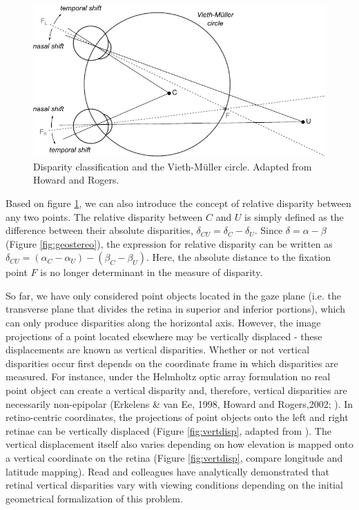 \documentclass[oneside,12pt]{classes/CUEDthesisPSnPDF}
\begin{document}
\begin{figure}
  \centering
  \includegraphics{disparity-classification}
  \caption{Disparity classification and the Vieth-M{\"u}ller circle. Adapted from Howard and Rogers.}
  \label{fig:dispclass}
\end{figure}

Based on figure \ref{fig:dispclass}, we can also introduce the concept of relative disparity between any two points. The relative disparity between $C$ and $U$ is simply defined as the difference between their absolute disparities, $\delta_{CU} = \delta_{C} - \delta_{U}$. Since $\delta  = \alpha - \beta$ (Figure \ref{fig:geostereo}), the expression for relative disparity can be written as $\delta_{CU} = (\alpha_C-\alpha_U) - (\beta_C-\beta_U)$. Here, the absolute distance to the fixation point $F$ is no longer determinant in the measure of disparity.

So far, we have only considered point objects located in the gaze plane (i.e. the transverse plane that divides the retina in superior and inferior portions), which can only produce disparities along the horizontal axis. However, the image projections of a point located elsewhere may be vertically displaced - these displacements are known as vertical disparities. Whether or not vertical disparities occur first depends on the coordinate frame in which disparities are measured. For instance, under the Helmholtz optic array formulation no real point object can create a vertical disparity and, therefore, vertical disparities are necessarily non-epipolar (Erkelens \& van Ee, 1998, Howard and Rogers,2002; \cite{Read2009}). In retino-centric coordinates, the projections of point objects onto the left and right retinae can be vertically displaced (Figure \ref{fig:vertdisp}, adapted from \cite{Read2009}). The vertical displacement itself also varies depending on how elevation is mapped onto a vertical coordinate on the retina (Figure \ref{fig:vertdisp}, compare longitude and latitude mapping). Read and colleagues \cite{Read2009} have analytically demonstrated that retinal vertical disparities vary with viewing conditions depending on the initial geometrical formalization of this problem.
\end{document}
